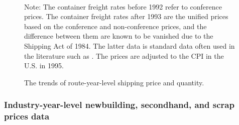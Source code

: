 \documentclass[11pt]{article}
\begin{document}
\begin{figure}[!ht]
\begin{center}
  \\
  \caption{The trends of route-year-level shipping price and quantity.}
  \label{fg:container_freight_rate_and_shipping_quantity_each_route}
  \end{center}
\footnotesize
   Note: The container freight rates before 1992 refer to conference prices. The container freight rates after 1993 are the unified prices based on the conference and non-conference prices, and the difference between them are known to be vanished due to the Shipping Act of 1984. The latter data is standard data often used in the literature such as \cite{jeon2017learning}. The prices are adjusted to the CPI in the U.S. in 1995.
\end{figure}


\subsubsection{Industry-year-level newbuilding, secondhand, and scrap prices data}
\end{document}

